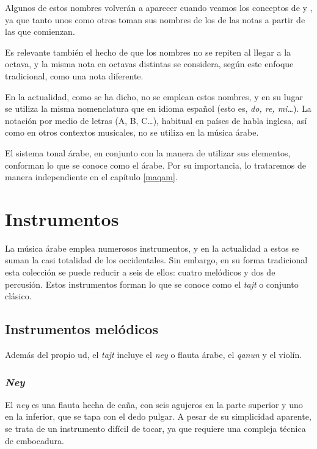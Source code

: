 Algunos de estos nombres volverán a aparecer cuando veamos los conceptos de \yins y \maqamb, ya que tanto unos como otros toman sus nombres de los de las notas a partir de las que comienzan.

Es relevante también el hecho de que los nombres no se repiten al llegar a la octava, y la misma nota en octavas distintas se considera, según este enfoque tradicional, como una nota diferente.

En la actualidad, como se ha dicho, no se emplean estos nombres, y en su lugar se utiliza la misma nomenclatura que en idioma español (esto es, \emph{do, re, mi\ldots}). La notación por medio de letras (A, B, C\ldots), habitual en países de habla inglesa, así como en otros contextos musicales, no se utiliza en la música árabe.

El sistema tonal árabe, en conjunto con la manera de utilizar sus elementos, conforman lo que se conoce como el \maqam árabe. Por su importancia, lo trataremos de manera independiente en el capítulo \ref{maqam}.

\section{Instrumentos}
\label{instrumentos}

    La música árabe emplea numerosos instrumentos, y en la actualidad a estos se suman la casi totalidad de los occidentales. Sin embargo, en su forma tradicional esta colección se puede reducir a seis de ellos: cuatro melódicos y dos de percusión. Estos instrumentos forman lo que se conoce como el \emph{tajt} o conjunto clásico.

    \subsection{Instrumentos melódicos}

    Además del propio ud, el \emph{tajt} incluye el \emph{ney} o flauta árabe, el \emph{qanun} y el violín.

    \subsubsection{\emph{Ney}}

    El \emph{ney} es una flauta hecha de caña, con seis agujeros en la parte superior y uno en la inferior, que se tapa con el dedo pulgar. A pesar de su simplicidad aparente, se trata de un instrumento difícil de tocar, ya que requiere una compleja técnica de embocadura.

